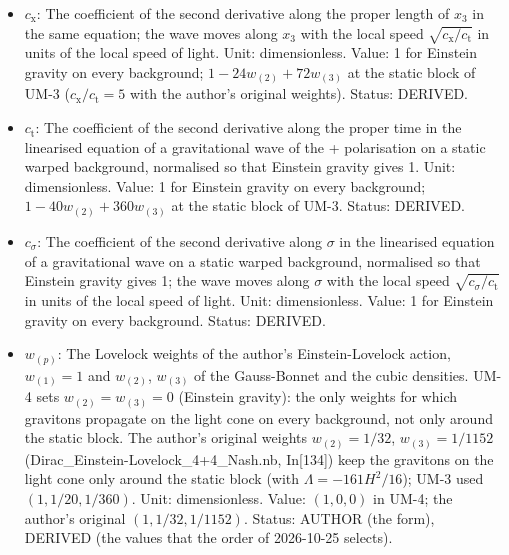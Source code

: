 \documentclass[
  10pt,
]{article}
\begin{document}
\begin{itemize}
  \(\vec x_5\): The position along the extra times,
  \(\vec x_5 = (x_5, x_6, x_7)\);
  \(\mathrm{d}\vec x_5^2 = \mathrm{d}x_5^2 + \mathrm{d}x_6^2 + \mathrm{d}x_7^2\).
  Unit: length. Status: AUTHOR.
\item
  \(c_{\mathrm{x}}\): The coefficient of the second derivative along the
  proper length of \(x_3\) in the same equation; the wave moves along
  \(x_3\) with the local speed \(\sqrt{c_{\mathrm{x}}/c_{\mathrm{t}}}\)
  in units of the local speed of light. Unit: dimensionless. Value: 1
  for Einstein gravity on every background;
  \(1 - 24w_{(2)} + 72w_{(3)}\) at the static block of UM-3
  (\(c_{\mathrm{x}}/c_{\mathrm{t}} = 5\) with the author's original
  weights). Status: DERIVED.
\item
  \(c_{\mathrm{t}}\): The coefficient of the second derivative along the
  proper time in the linearised equation of a gravitational wave of the
  + polarisation on a static warped background, normalised so that
  Einstein gravity gives 1. Unit: dimensionless. Value: 1 for Einstein
  gravity on every background; \(1 - 40w_{(2)} + 360w_{(3)}\) at the
  static block of UM-3. Status: DERIVED.
\item
  \(c_\sigma\): The coefficient of the second derivative along
  \(\sigma\) in the linearised equation of a gravitational wave on a
  static warped background, normalised so that Einstein gravity gives 1;
  the wave moves along \(\sigma\) with the local speed
  \(\sqrt{c_\sigma/c_{\mathrm{t}}}\) in units of the local speed of
  light. Unit: dimensionless. Value: 1 for Einstein gravity on every
  background. Status: DERIVED.
\item
  \(w_{(p)}\): The Lovelock weights of the author's Einstein-Lovelock
  action, \(w_{(1)} = 1\) and \(w_{(2)}\), \(w_{(3)}\) of the
  Gauss-Bonnet and the cubic densities. UM-4 sets
  \(w_{(2)} = w_{(3)} = 0\) (Einstein gravity): the only weights for
  which gravitons propagate on the light cone on every background, not
  only around the static block. The author's original weights
  \(w_{(2)} = 1/32\), \(w_{(3)} = 1/1152\)
  (Dirac\_Einstein-Lovelock\_4+4\_Nash.nb, In{[}134{]}) keep the
  gravitons on the light cone only around the static block (with
  \(\Lambda = -161H^2/16\)); UM-3 used \((1, 1/20, 1/360)\). Unit:
  dimensionless. Value: \((1, 0, 0)\) in UM-4; the author's original
  \((1, 1/32, 1/1152)\). Status: AUTHOR (the form), DERIVED (the values
  that the order of 2026-10-25 selects).
\end{itemize}
\end{document}
